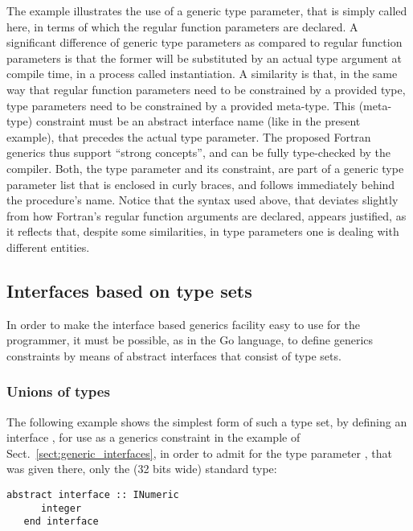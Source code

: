 \documentclass[11pt,oneside]{report}
\newcommand{\code}[1]{{\selectfont\ttfamily{#1}}}
\begin{document}
The example illustrates the use of a generic type parameter, that is
simply called \code{T} here, in terms of which the regular function
parameters are declared. A significant difference of generic type
parameters as compared to regular function parameters is that the
former will be substituted by an actual type argument at compile time,
in a process called instantiation. A similarity is that, in the same
way that regular function parameters need to be constrained by a
provided type, type parameters need to be constrained by a provided
meta-type. This (meta-type) constraint must be an abstract interface
name (like \code{INumeric} in the present example), that precedes the
actual type parameter. The proposed Fortran generics thus support
``strong concepts'', and can be fully type-checked by the
compiler. Both, the type parameter and its constraint, are part of a
generic type parameter list that is enclosed in curly braces, and
follows immediately behind the procedure's name. Notice that the
syntax used above, that deviates slightly from how Fortran's regular
function arguments are declared, appears justified, as it reflects
that, despite some similarities, in type parameters one is dealing
with different entities.

\subsection{Interfaces based on type sets}
\label{sect:type_sets}

In order to make the interface based generics facility easy to use for
the programmer, it must be possible, as in the Go language, to define
generics constraints by means of abstract interfaces that consist of
type sets.

\subsubsection{Unions of types}

The following example shows the simplest form of such a type set, by
defining an interface \code{INumeric}, for use as a generics
constraint in the example of Sect.~\ref{sect:generic_interfaces}, in
order to admit for the type parameter \code{T}, that was given there,
only the (32 bits wide) standard \code{integer} type:
\begin{lstlisting}[language=LFortran,style=boxed]
   abstract interface :: INumeric
      integer
   end interface
\end{lstlisting}
\end{document}
